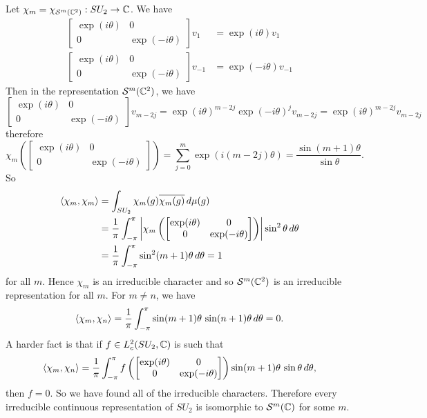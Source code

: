 \begin{exam}[$SU_2$]
  Let $\chi_m = \chi_{\mathcal{S}^m(\mathbb{C}^2)}: SU_2 \to \mathbb{C}$.
  We have
  \begin{align*}
    \begin{bmatrix}
      \exp(i\theta) & 0 \\ 0 & \exp(-i\theta)
    \end{bmatrix}
    v_1 &= \exp(i\theta) v_1 \\
    \begin{bmatrix}
      \exp(i\theta) & 0 \\ 0 & \exp(-i\theta)
    \end{bmatrix}
    v_{-1} &= \exp(-i\theta) v_{-1}
  \end{align*}
  Then in the representation $\mathcal{S}^m(\mathbb{C}^2)$, we have
  \begin{equation*}
    \begin{bmatrix}
      \exp(i\theta) & 0 \\ 0 & \exp(-i\theta)
    \end{bmatrix}
    v_{m-2j} = \exp(i\theta)^{m-2j} \exp(-i\theta)^j v_{m-2j} = \exp(i\theta)^{m-2j} v_{m-2j}
  \end{equation*}
  therefore
  \begin{equation*}
    \chi_m \left(
    \begin{bmatrix}
      \exp(i\theta) & 0 \\ 0 & \exp(-i\theta)
    \end{bmatrix}
  \right) = \sum_{j=0}^m \exp(i(m-2j)\theta) = \frac{\sin(m+1)\theta}{\sin\theta}.
  \end{equation*}
  So
  \begin{align*}
    {\left\langle \chi_m,\chi_m \right\rangle} &= \int_{SU_2} \chi_m(g) \overline{\chi_m(g)} \, d\mu(g) \\
    &= \frac 1\pi \int_{-\pi}^\pi \left\lvert 
      \chi_m \left( 
      \begin{bmatrix}
	\exp(i\theta) & 0 \\ 0 & \exp(-i\theta)
      \end{bmatrix}
      \right)
     \right\rvert \sin^2\theta \, d\theta \\
    &= \frac 1\pi \int_{-\pi}^\pi \sin^2(m+1)\theta \, d\theta = 1
  \end{align*}
  for all $m$.
  Hence $\chi_m$ is an irreducible character and so $\mathcal{S}^m(\mathbb{C}^2)$ is an irreducible representation for all $m$.
  For $m \neq n$, we have
  \[ {\left\langle \chi_m,\chi_n \right\rangle} = \frac 1\pi \int_{-\pi}^\pi \sin(m+1)\theta \, \sin(n+1)\theta \, d\theta = 0. \]
  A harder fact is that if $f \in L^2_c(SU_2,\mathbb{C})$ is such that
  \[ {\left\langle \chi_m,\chi_n \right\rangle} = \frac 1\pi \int_{-\pi}^\pi f \left( 
    \begin{bmatrix}
      \exp(i\theta) & 0 \\ 0 & \exp(-i\theta)
    \end{bmatrix}
  \right) \sin(m+1)\theta \, \sin\theta \, d\theta, \]
  then $f=0$.
  So we have found all of the irreducible characters.
  Therefore every irreducible continuous representation of $SU_2$ is isomorphic to $\mathcal{S}^m(\mathbb{C})$ for some $m$.
\end{exam}

